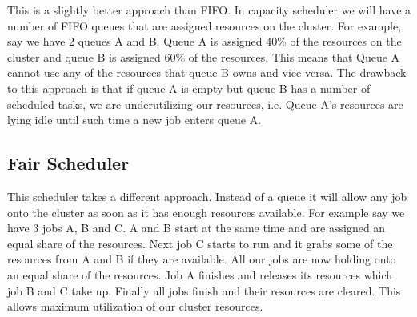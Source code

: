 This is a slightly better approach than FIFO. In capacity scheduler we will have a number of FIFO queues that are assigned resources on the cluster. For example, say we have 2 queues A and B. Queue A is assigned 40\% of the resources on the cluster and queue B is assigned 60\% of the resources. This means that Queue A cannot use any of the resources that queue B owns and vice versa. 
The drawback to this approach is that if queue A is empty but queue B has a number of scheduled tasks, we are underutilizing our resources, i.e. Queue A's resources are lying idle until such time a new job enters queue A.

\subsection{Fair Scheduler}

This scheduler takes a different approach. Instead of a queue it will allow any job onto the cluster as soon as it has enough resources available. For example say we have 3 jobs A, B and C. A and B start at the same time and are assigned an equal share of the resources. Next job C starts to run and it grabs some of the resources from A and B if they are available. All our jobs are now holding onto an equal share of the resources. Job A finishes and releases its resources which job B and C take up. Finally all jobs finish and their resources are cleared. This allows maximum utilization of our cluster resources.
